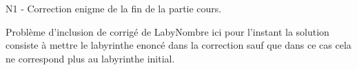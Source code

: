    N1 - Correction enigme de la fin de la partie cours.
    \LabyNombre[Multiple=10,Longueur=12,Largeur=8,XDepart=2,YDepart=2,XArrivee=10,YArrivee=6]

    Problème d'inclusion de corrigé de LabyNombre ici pour l'instant la solution consiste
    à mettre le labyrinthe enoncé dans la correction sauf que dans ce cas cela ne correspond plus au labyrinthe initial.

    \LabyNombre[Multiple=10,Longueur=12,Largeur=8,XDepart=2,YDepart=2,XArrivee=10,YArrivee=6,Solution]
